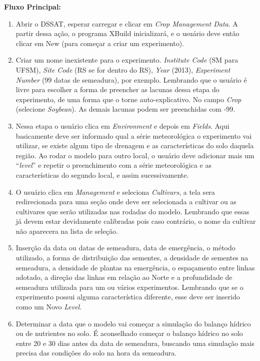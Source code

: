 \documentclass[tg]{mdtufsm}
\begin{document}
            	{\bf Fluxo Principal:}
                	\begin{enumerate}
                		\item  Abrir o DSSAT, esperar carregar e clicar em \emph{Crop Management Data}. A partir dessa ação, o programa XBuild inicializará, e o usuário deve então clicar em New (para começar a criar um experimento).
                		\item  Criar um nome inexistente para o experimento. \emph{Institute Code} (SM para UFSM), \emph{Site Code} (RS se for dentro do RS), \emph{Year} (2013), \emph{Experiment Number} (99 datas de semeadura), por exemplo. Lembrando que o usuário é livre para escolher a forma de preencher as lacunas dessa etapa do experimento, de uma forma que o torne auto-explicativo. No campo \emph{Crop} (selecione \emph{Soybean}). As demais lacunas podem ser preenchidas com -99.
                		\item Nessa etapa o usuário clica em \emph{Environment} e depois em \emph{Fields}. Aqui basicamente deve ser informado qual a série meteorológica o experimento vai utilizar, se existe algum tipo de drenagem e as características do solo daquela região. Ao rodar o modelo para outro local, o usuário deve adicionar mais um “\emph{level}” e repetir o preenchimento com a série meteorológica e as características do segundo local, e assim sucessivamente.
                		\item O usuário clica em \emph{Management} e seleciona \emph{Cultivars}, a tela sera redirecionada para uma seção onde deve ser selecionada a cultivar ou as cultivares que serão utilizadas nas rodadas do modelo. Lembrando que essas já devem estar devidamente calibradas pois caso contrário, o nome da cultivar não aparecera na lista de seleção.
                		\item Inserção da data ou datas de semeadura, data de emergência, o método utilizado, a forma de distribuição das sementes, a densidade de sementes na semeadura, a densidade de plantas na emergência, o espaçamento entre linhas adotado, a direção das linhas em relação ao Norte e a profundidade de semeadura utilizada para um ou vários experimentos. Lembrando que se o experimento possui alguma característica diferente, esse deve ser inserido como um Novo \emph{Level}.
                		\item Determinar a data que o modelo vai começar a simulação do balanço hídrico ou de nutrientes no solo. É aconselhado começar o balanço hídrico no solo entre 20 e 30 dias antes da data de semeadura, buscando uma simulação mais precisa das condições do solo na hora da semeadura.

\end{enumerate}
\end{document}
